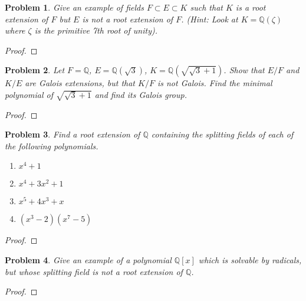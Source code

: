 \documentclass[10pt]{article}
\newcommand{\sk}{\vskip 10mm}
\newcommand{\bb}[1]{\mathbb{#1}}
\theoremstyle{plain}
\newtheorem{problem}{Problem}
\theoremstyle{remark}
\begin{document}
\begin{problem}
  Give an example of fields $F\subset E\subset K$   such that $K$ is a root
  extension of $F$ but $E$ is not a root extension of $F$.
  (Hint: Look at $K=\bb{Q}(\zeta)$ where $\zeta$ is the primitive
  7th root of unity).
\end{problem}

\begin{proof}
  
\end{proof}

\sk

\begin{problem}
  Let $F=\bb{Q}$, $E=\bb{Q}(\sqrt{3})$, $K=\bb{Q}(\sqrt{\sqrt{3}+1})$.
  Show that $E/F$ and $K/E$ are Galois extensions, but that $K/F$
  is not Galois. Find the minimal polynomial of $\sqrt{\sqrt{3}+1}$
  and find its Galois group.
\end{problem}

\begin{proof}
  
\end{proof}

\sk

\begin{problem}
  Find a root extension of $\bb{Q}$ containing the splitting fields
  of each of the following polynomials.
  \begin{enumerate}
  \item[(a)] $x^4+1$
  \item[(b)] $x^4+3x^2+1$
  \item[(c)] $x^5+4x^3+x$
  \item[(d)] $(x^3-2)(x^7-5)$
  \end{enumerate}
\end{problem}

\begin{proof}
  
\end{proof}

\sk

\begin{problem}
  Give an example of a polynomial $\bb{Q}[x]$ which is solvable by radicals,
  but whose splitting field is not a root extension of $\bb{Q}$.
\end{problem}

\begin{proof}
  
\end{proof}

\sk
\end{document}

